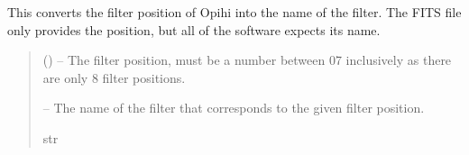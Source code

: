 \documentclass[letterpaper,11pt,english]{sphinxmanual}
\begin{document}
\begin{savenotes}\begin{fulllineitems}
\label{\detokenize{code/opihiexarata.library.conversion:opihiexarata.library.conversion.filter_position_to_filter_name}}
\pysigstartsignatures
{}
\pysigstopsignatures
\sphinxAtStartPar
This converts the filter position of Opihi into the name of the filter.
The FITS file only provides the position, but all of the software
expects its name.
\begin{quote}\begin{description}
\sphinxAtStartPar
{} () – The filter position, must be a number between 0\sphinxhyphen{}7 inclusively as there
are only 8 filter positions.

\sphinxAtStartPar
{} – The name of the filter that corresponds to the given filter position.

\sphinxAtStartPar
str

\end{description}\end{quote}

\end{fulllineitems}\end{savenotes}

\end{document}

